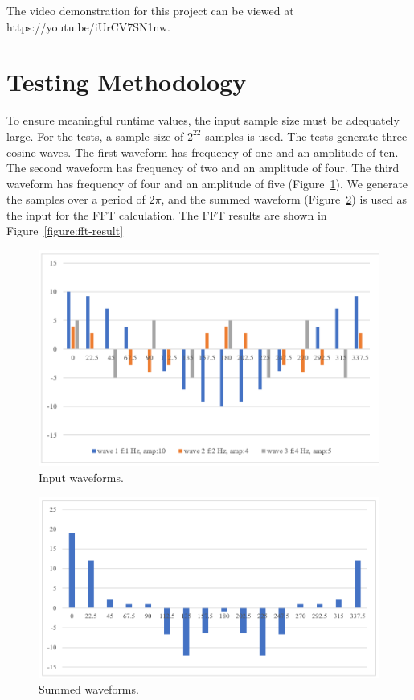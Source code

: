 \documentclass{amsart}
\begin{document}
The video demonstration for this project can be viewed at https://youtu.be/iUrCV7SN1nw.


\section{Testing Methodology}
To ensure meaningful runtime values, the input sample size must be adequately large. For the tests, a sample size of $2^{22}$ samples is used. The tests generate three cosine waves. The first waveform has frequency of one and an amplitude of ten. The second waveform has frequency of two and an amplitude of four. The third waveform has frequency of four and an amplitude of five (Figure~\ref{figure:input-waveforms}). We generate the samples over a period of $2\pi$, and the summed waveform (Figure~\ref{figure:summed-waveform}) is used as the input for the FFT calculation. The FFT results are shown in Figure~\ref{figure:fft-result}

\begin{figure}[htbp]
\caption{Input waveforms.}
\begin{center}
\includegraphics{input-waveforms.PNG}
\end{center}
\label{figure:input-waveforms}
\end{figure}

\begin{figure}[H]
\caption{Summed waveforms.}
\begin{center}
\includegraphics{summed-waveform.PNG}
\end{center}
\label{figure:summed-waveform}
\end{figure}
\end{document}
